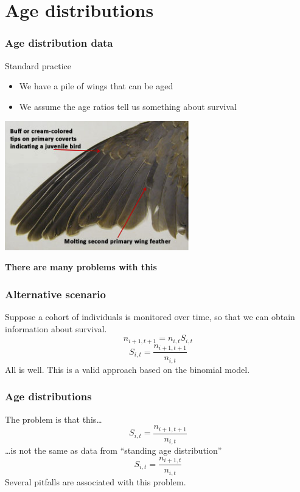 \documentclass[color=usenames,dvipsnames]{beamer}\usepackage[]{graphicx}\usepackage[]{color}
\begin{document}
\section{Age distributions}



\begin{frame}
  \frametitle{Age distribution data}
  {%
    Standard practice}
  \begin{itemize}
    \item We have a pile of wings that can be aged \\
    \item We assume the age ratios tell us something about survival
  \end{itemize}
  \begin{center}
    \includegraphics[width=0.6\textwidth]{figs/dove_wing}
  \end{center}
  \pause
  {\centering \alert{\bf There are many problems with this} \par}
\end{frame}





\begin{frame}
  \frametitle{Alternative scenario}
  Suppose a cohort of individuals is monitored over time, so that we
  can obtain information about survival.
  \Large
\[
  n_{i+1,t+1} = n_{i,t}S_{i,t}
\]
\pause
\[
  S_{i,t} = \frac{n_{i+1,t+1}}{n_{i,t}}
\]
\normalsize
\pause
\vfill
\centering %
  All is well. This is a valid approach based on the
  binomial model. \\
\end{frame}



\begin{frame}
  \frametitle{Age distributions}
  \large
  The problem is that this\dots
  \Large
\[
  S_{i,t} = \frac{n_{i+1,t+1}}{n_{i,t}}
\]
  \pause
  \large
  \dots is not the same as data from ``standing age distribution''
  \Large
\[
  S_{i,t} = \frac{n_{i+1,t}}{n_{i,t}}
\]
  \large
  \pause
  \vfill
  Several pitfalls are associated with this problem.
\end{frame}
\end{document}
